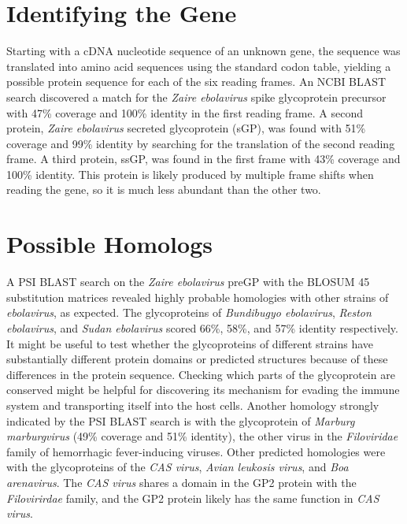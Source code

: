 \documentclass[a4paper,12pt]{article}
\begin{document}
\section{Identifying the Gene}
Starting with a cDNA nucleotide sequence of an unknown gene, the sequence was translated into amino acid sequences using the standard codon table, yielding a possible protein sequence for each of the six reading frames. \cite{pmid10827456} An NCBI BLAST search discovered a match for the \textit{Zaire ebolavirus} spike glycoprotein precursor with 47\% coverage and 100\% identity in the first reading frame. A second protein, \textit{Zaire ebolavirus} secreted glycoprotein (sGP), was found with 51\% coverage and 99\% identity by searching for the translation of the second reading frame. A third protein, ssGP, was found in the first frame with 43\% coverage and 100\% identity. This protein is likely produced by multiple frame shifts when reading the gene, so it is much less abundant than the other two.
\section{Possible Homologs}
A PSI BLAST search on the \textit{Zaire ebolavirus} preGP with the BLOSUM 45 substitution matrices revealed highly probable homologies with other strains of \textit{ebolavirus}, as expected. The glycoproteins of \textit{Bundibugyo ebolavirus}, \textit{Reston ebolavirus}, and \textit{Sudan ebolavirus} scored 66\%, 58\%, and 57\% identity respectively. It might be useful to test whether the glycoproteins of different strains have substantially different protein domains or predicted structures because of these differences in the protein sequence. Checking which parts of the glycoprotein are conserved might be helpful for discovering its mechanism for evading the immune system and transporting itself into the host cells. 
Another homology strongly indicated by the PSI BLAST search is with the glycoprotein of \textit{Marburg marburgvirus} (49\% coverage and 51\% identity), the other virus in the \textit{Filoviridae} family of hemorrhagic fever-inducing viruses. \cite{pmid23202446}
Other predicted homologies were with the glycoproteins of the \textit{CAS virus}, \textit{Avian leukosis virus}, and \textit{Boa arenavirus}. The \textit{CAS virus} shares a domain in the GP2 protein with the \textit{Filovirirdae} family, and the GP2 protein likely has the same function in \textit{CAS virus}.
\end{document}
